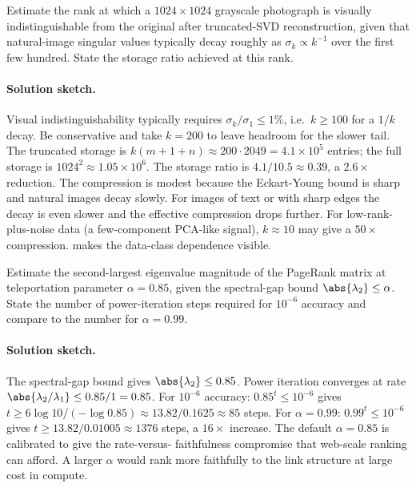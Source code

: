 \begin{exercise}
Estimate the rank at which a $1024 \times 1024$ grayscale photograph
is visually indistinguishable from the original after truncated-SVD
reconstruction, given that natural-image singular values typically
decay roughly as $\sigma_{k} \propto k^{-1}$ over the first few
hundred. State the storage ratio achieved at this rank.
\end{exercise}

\paragraph{Solution sketch.}
Visual indistinguishability typically requires
$\sigma_{k}/\sigma_{1} \leq 1\%$, i.e.\ $k \geq 100$ for a $1/k$
decay. Be conservative and take $k = 200$ to leave headroom for the
slower tail. The truncated storage is $k(m + 1 + n) \approx 200
\cdot 2049 = 4.1 \times 10^{5}$ entries; the full storage is
$1024^{2} \approx 1.05 \times 10^{6}$. The storage ratio is
$4.1/10.5 \approx 0.39$, a $2.6 \times$ reduction. The compression
is modest because the Eckart-Young bound is sharp and natural
images decay slowly. For images of text or with sharp edges the
decay is even slower and the effective compression drops further.
For low-rank-plus-noise data (a few-component PCA-like signal),
$k \approx 10$ may give a $50 \times$ compression.
 makes the data-class
dependence visible.

\begin{exercise}
Estimate the second-largest eigenvalue magnitude of the PageRank
matrix at teleportation parameter $\alpha = 0.85$, given the
spectral-gap bound $\abs{\lambda_{2}} \leq \alpha$. State the number
of power-iteration steps required for $10^{-6}$ accuracy and
compare to the number for $\alpha = 0.99$.
\end{exercise}

\paragraph{Solution sketch.}
The spectral-gap bound gives $\abs{\lambda_{2}} \leq 0.85$. Power
iteration converges at rate $\abs{\lambda_{2}/\lambda_{1}} \leq 0.85
/1 = 0.85$. For $10^{-6}$ accuracy: $0.85^{t} \leq 10^{-6}$ gives
$t \geq 6 \log 10 / (-\log 0.85) \approx 13.82/0.1625 \approx 85$
steps. For $\alpha = 0.99$: $0.99^{t} \leq 10^{-6}$ gives $t \geq
13.82/0.01005 \approx 1376$ steps, a $16 \times$ increase. The
default $\alpha = 0.85$ is calibrated to give the rate-versus-
faithfulness compromise that web-scale ranking can afford. A larger
$\alpha$ would rank more faithfully to the link structure at large
cost in compute.

